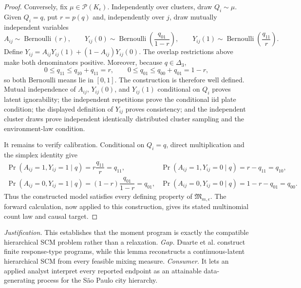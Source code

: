 \documentclass{article}
\begin{document}
\begin{proof}
Conversely, fix \(\mu\in\mathcal P(K_{\epsilon})\). Independently over clusters, draw \(Q_i\sim\mu\). Given \(Q_i=q\), put \(r=p(q)\) and, independently over \(j\), draw mutually independent variables
\[
 A_{ij}\sim\operatorname{Bernoulli}(r),\qquad
 Y_{ij}(0)\sim\operatorname{Bernoulli}\!\left(\frac{q_{01}}{1-r}\right),\qquad
 Y_{ij}(1)\sim\operatorname{Bernoulli}\!\left(\frac{q_{11}}{r}\right).
\]
Define \(Y_{ij}=A_{ij}Y_{ij}(1)+(1-A_{ij})Y_{ij}(0)\). The overlap restrictions above make both denominators positive. Moreover, because \(q\in\Delta_3\),
\[
 0\leq q_{11}\leq q_{10}+q_{11}=r,
 \qquad
 0\leq q_{01}\leq q_{00}+q_{01}=1-r,
\]
so both Bernoulli means lie in \([0,1]\). The construction is therefore well defined. Mutual independence of \(A_{ij}\), \(Y_{ij}(0)\), and \(Y_{ij}(1)\) conditional on \(Q_i\) proves latent ignorability; the independent repetitions prove the conditional iid plate condition; the displayed definition of \(Y_{ij}\) proves consistency; and the independent cluster draws prove independent identically distributed cluster sampling and the environment-law condition.

It remains to verify calibration. Conditional on \(Q_i=q\), direct multiplication and the simplex identity give
\[
 \begin{array}{ll}
 \Pr(A_{ij}=1,Y_{ij}=1\mid q)
 =r\dfrac{q_{11}}r=q_{11},
 &
 \Pr(A_{ij}=1,Y_{ij}=0\mid q)
 =r-q_{11}=q_{10},\\[6pt]
 \Pr(A_{ij}=0,Y_{ij}=1\mid q)
 =(1-r)\dfrac{q_{01}}{1-r}=q_{01},
 &
 \Pr(A_{ij}=0,Y_{ij}=0\mid q)
 =1-r-q_{01}=q_{00}.
 \end{array}
\]
Thus the constructed model satisfies every defining property of \(\mathfrak M_{m,\epsilon}\). The forward calculation, now applied to this construction, gives its stated multinomial count law and causal target.
\end{proof}
\par\smallskip\noindent \textit{Justification.} This establishes that the moment program is exactly the compatible hierarchical SCM problem rather than a relaxation. \textit{Gap.} Duarte et al. construct finite response-type programs, while this lemma reconstructs a continuous-latent hierarchical SCM from every feasible mixing measure. \textit{Consumer.} It lets an applied analyst interpret every reported endpoint as an attainable data-generating process for the São Paulo city hierarchy.
\end{document}
